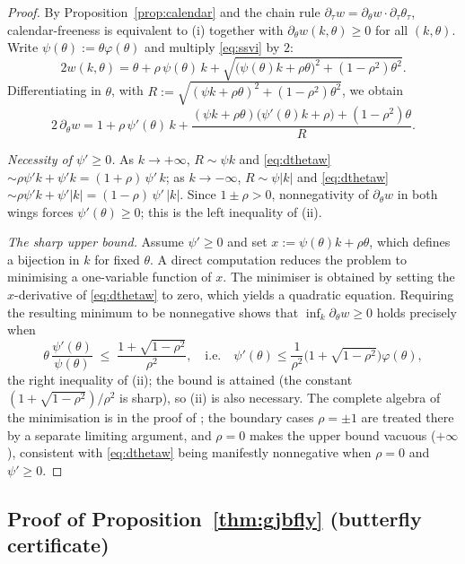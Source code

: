 \begin{proof}
By Proposition~\ref{prop:calendar} and the chain rule
$\partial_\tau w=\partial_\theta w\cdot\partial_\tau\theta_\tau$, calendar-freeness is
equivalent to (i) together with $\partial_\theta w(k,\theta)\ge0$ for all $(k,\theta)$. Write
$\psi(\theta):=\theta\varphi(\theta)$ and multiply \eqref{eq:ssvi} by $2$:
\[
2w(k,\theta)=\theta+\rho\,\psi(\theta)\,k
+\sqrt{\bigl(\psi(\theta)k+\rho\theta\bigr)^2+(1-\rho^2)\theta^2}.
\]
Differentiating in $\theta$, with
$R:=\sqrt{(\psi k+\rho\theta)^2+(1-\rho^2)\theta^2}$, we obtain
\begin{equation}\label{eq:dthetaw}
2\,\partial_\theta w
=1+\rho\,\psi'(\theta)\,k
+\frac{(\psi k+\rho\theta)\bigl(\psi'(\theta)k+\rho\bigr)+(1-\rho^2)\theta}{R}.
\end{equation}

\emph{Necessity of $\psi'\ge0$.} As $k\to+\infty$, $R\sim\psi k$ and
\eqref{eq:dthetaw} $\sim\rho\psi'k+\psi'k=(1+\rho)\,\psi'\,k$; as $k\to-\infty$,
$R\sim\psi|k|$ and \eqref{eq:dthetaw} $\sim\rho\psi'k+\psi'|k|=(1-\rho)\,\psi'\,|k|$. Since
$1\pm\rho>0$, nonnegativity of $\partial_\theta w$ in both wings forces $\psi'(\theta)\ge0$;
this is the left inequality of (ii).

\emph{The sharp upper bound.} Assume $\psi'\ge0$ and set
$x:=\psi(\theta)k+\rho\theta$, which defines a bijection in $k$ for fixed $\theta$.
A direct computation reduces the problem to minimising a one-variable function of $x$.
The minimiser is obtained by setting the $x$-derivative of \eqref{eq:dthetaw} to zero,
which yields a quadratic equation. Requiring the resulting minimum to be nonnegative shows
that $\inf_k\partial_\theta w\ge0$ holds precisely when
\[
\theta\,\frac{\psi'(\theta)}{\psi(\theta)}\;\le\;\frac{1+\sqrt{1-\rho^2}}{\rho^2},
\quad\text{i.e.}\quad
\psi'(\theta)\le\frac{1}{\rho^2}\bigl(1+\sqrt{1-\rho^2}\bigr)\varphi(\theta),
\]
the right inequality of (ii); the bound is attained (the constant
$(1+\sqrt{1-\rho^2})/\rho^2$ is sharp), so (ii) is also necessary. The complete algebra of
the minimisation is in the proof of \cite[Thm.~4.1]{gatheraljacquier2014}; the boundary cases
$\rho=\pm1$ are treated there by a separate limiting argument, and $\rho=0$ makes the upper
bound vacuous ($+\infty$), consistent with \eqref{eq:dthetaw} being manifestly nonnegative
when $\rho=0$ and $\psi'\ge0$.
\end{proof}

\subsection{Proof of Proposition~\ref{thm:gjbfly} (butterfly certificate)}
\label{proof:gjbfly}

